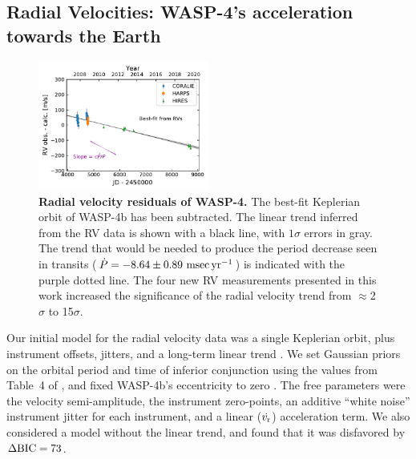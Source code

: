\documentclass[12pt,twocolumn,tighten]{aastex62}
\begin{document}
\subsection{Radial Velocities: WASP-4's acceleration towards the Earth}

\begin{figure}[t]
	\begin{center}
		\leavevmode
		\includegraphics[width=0.5\textwidth]{f2.pdf}
	\end{center}
	\vspace{-0.7cm}
	\caption{
    {\bf Radial velocity residuals of WASP-4.} The best-fit
    Keplerian orbit of WASP-4b has been subtracted.  The linear trend
    inferred from the RV data is shown with a black line, with
    $1\sigma$ errors in gray.  The trend that would be needed to
    produce the period decrease seen in transits ($\dot{P}= - 8.64 \pm
    0.89~{\rm msec}\,{\rm yr}^{-1}$) is indicated with the purple dotted
    line.  The four new RV measurements presented in this work
    increased the significance of the radial velocity trend from
    $\approx$2$\sigma$ to 15$\sigma$.
	\label{fig:rvs}
  \vspace{-0.3cm}
	}
\end{figure}

Our initial model for the radial velocity data was a single Keplerian
orbit, plus instrument offsets, jitters, and a long-term linear trend
\citep[][\texttt{radvel}]{fulton_radvel_2018}.  We set Gaussian priors
on the orbital period and time of inferior conjunction using the
values from Table~4 of , and fixed
WASP-4b's eccentricity to zero
\citep{beerer_secondary_2011,knutson_friends_2014,bonomo_gaps_2017}.
The free parameters were the velocity semi-amplitude, the instrument
zero-points, an additive ``white noise'' instrument jitter for each
instrument, and a linear ($\dot{v_{\rm r}}$) acceleration term.  We
also considered a model without the linear trend, and found that it
was disfavored by $\Delta {\rm BIC}=73$.
\end{document}
